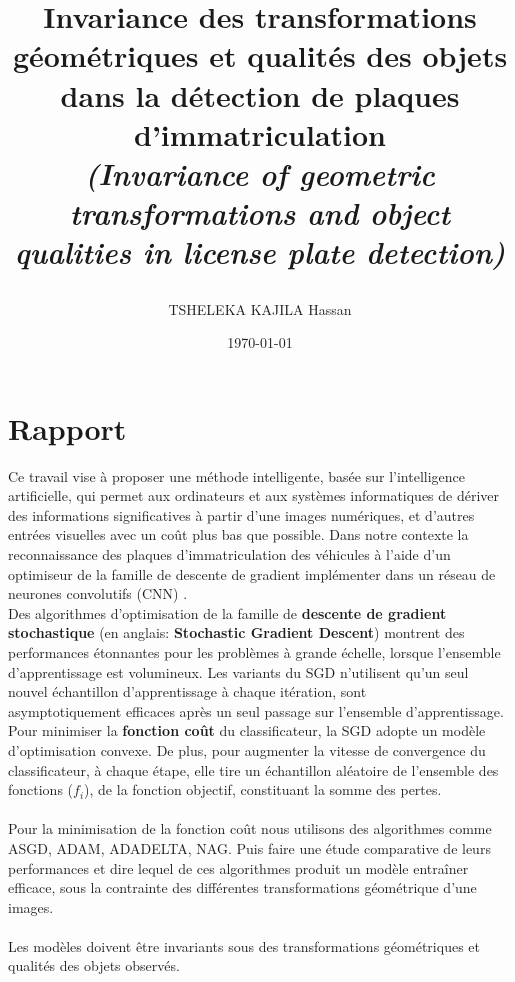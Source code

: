 \documentclass[11pt,a4paper]{report}
\title{\Large{{\bf{Invariance des transformations géométriques et qualités des objets dans la  détection de plaques d'immatriculation}}\\
{\textit{(Invariance of geometric transformations and object qualities in license plate detection)}}

}}
\author{TSHELEKA KAJILA Hassan}
\date{\today}
\begin{document}
	
	\renewcommand\thesubsubsection{\Alph{subsubsection}}
	\setcounter{chapter}{-1}
	
	
	\maketitle

	
	
	
	\chapter*{Rapport} 
	
	Ce travail vise à proposer une méthode  intelligente, basée sur l'intelligence artificielle, qui permet aux ordinateurs et aux systèmes informatiques de dériver des informations significatives à partir d'une images numériques, et d'autres entrées visuelles avec un coût plus bas que possible. Dans notre contexte la reconnaissance des plaques d’immatriculation des véhicules à l'aide d’un optimiseur de la famille de descente de gradient implémenter dans un réseau de neurones convolutifs (CNN) . \\
	Des algorithmes d'optimisation de la famille de \textbf{descente de gradient stochastique} (en anglais: \textbf{Stochastic Gradient Descent}) montrent des performances étonnantes pour les problèmes à grande échelle, lorsque l'ensemble d'apprentissage est volumineux.
	Les variants du SGD n'utilisent qu'un seul nouvel échantillon d'apprentissage à chaque itération, sont \\asymptotiquement efficaces après un seul passage sur l'ensemble d'apprentissage.
	\\Pour minimiser la \textbf{fonction coût} du classificateur, la SGD adopte un modèle d'optimisation convexe. De plus, pour augmenter la vitesse de convergence du classificateur, à chaque étape, elle tire un échantillon aléatoire de l'ensemble des fonctions ($f_i$), de la fonction objectif, constituant la somme des pertes.\\\\
	Pour la minimisation de la fonction coût nous utilisons des algorithmes comme ASGD, ADAM, ADADELTA, NAG. Puis faire une étude comparative de leurs performances et dire lequel de ces algorithmes produit un modèle entraîner efficace, sous la contrainte des différentes transformations géométrique d'une images.\\\\
	Les modèles doivent être invariants sous des transformations géométriques et qualités des objets observés.
	
\end{document}
